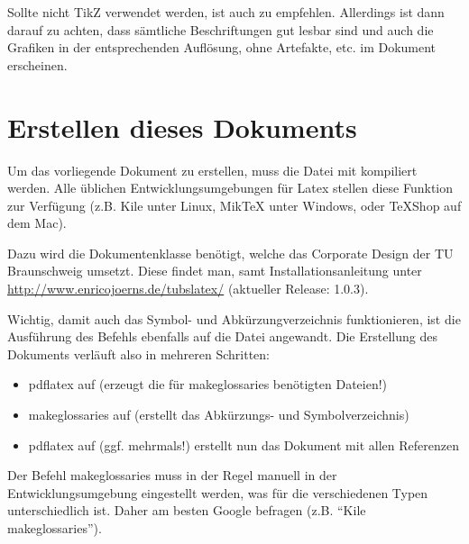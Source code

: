 Sollte nicht TikZ verwendet werden, ist auch  zu empfehlen. Allerdings ist dann darauf zu achten, dass sämtliche Beschriftungen gut lesbar sind und 
auch die Grafiken in der entsprechenden Auflösung, ohne Artefakte, etc. im Dokument erscheinen.

\section{Erstellen dieses Dokuments}

Um das vorliegende Dokument zu erstellen, muss die Datei  mit  kompiliert werden. Alle üblichen Entwicklungsumgebungen für Latex 
stellen diese Funktion zur Verfügung (z.B. Kile unter Linux, MikTeX unter Windows, oder TeXShop auf dem Mac).

Dazu wird die Dokumentenklasse  benötigt, welche das Corporate Design der TU Braunschweig umsetzt. Diese findet man, samt Installationsanleitung 
unter \url{http://www.enricojoerns.de/tubslatex/} (aktueller Release: 1.0.3).

Wichtig, damit auch das Symbol- und Abkürzungverzeichnis funktionieren, ist die Ausführung des Befehls  ebenfalls auf die Datei 
 angewandt. Die Erstellung des Dokuments verläuft also in mehreren Schritten:
\begin{itemize}
 \item pdflatex auf  (erzeugt die für makeglossaries benötigten Dateien!)
 \item makeglossaries auf  (erstellt das Abkürzungs- und Symbolverzeichnis)
 \item pdflatex auf  (ggf. mehrmals!) erstellt nun das Dokument mit allen Referenzen
\end{itemize}
Der Befehl makeglossaries muss in der Regel manuell in der Entwicklungsumgebung eingestellt werden, was für die verschiedenen Typen unterschiedlich ist. Daher 
am besten Google befragen (z.B. ``Kile makeglossaries'').
